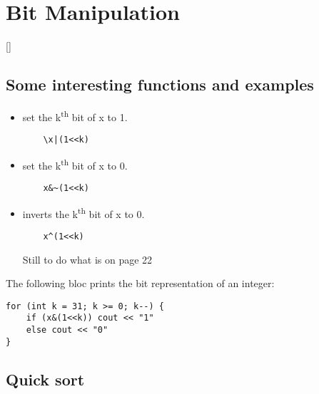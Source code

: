 \chapter{Bit Manipulation}

[\cite[See][- 2.3 Bit Manipulations]{LaaksonenGuideToCompetitiveProgramming}]

\section{Some interesting functions and examples}

\begin{itemize}
	\item set the k\textsuperscript{th} bit of x to 1. 
	\begin{lstlisting}
	\x|(1<<k)
	\end{lstlisting}
	\item set the k\textsuperscript{th} bit of x to 0.
	\begin{lstlisting}
	x&~(1<<k)
	\end{lstlisting}
	\item inverts the k\textsuperscript{th} bit of x to 0.
	\begin{lstlisting}
	x^(1<<k)
	\end{lstlisting}
	
	Still to do what is on page 22
		
\end{itemize}




The following bloc prints the bit representation of an integer:

\color{blue}
\begin{lstlisting}[frame=single]
for (int k = 31; k >= 0; k--) {
	if (x&(1<<k)) cout << "1"
	else cout << "0"		
}

\end{lstlisting}

\color{black}
\section{Quick sort}
